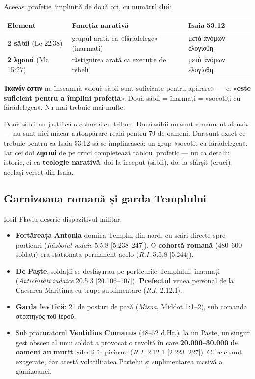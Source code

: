 \documentclass[12pt,a4paper,twoside,openany]{book}
\begin{document}
Aceeași profeție, împlinită de două ori, cu numărul \textbf{doi}:

\begin{center}
\small
\begin{tabularx}{\textwidth}{L{3.5cm}L{4.5cm}X}
\toprule
{}
\textbf{Element} & \textbf{Funcția narativă} & \textbf{Isaia 53:12} \\
\midrule
\textbf{2 săbii} (Lc 22:38) & grupul arată ca «fărădelege» (înarmați) & μετὰ ἀνόμων ἐλογίσθη \\
\textbf{2 λῃσταί} (Mc 15:27) & răstignirea arată ca execuție de rebeli & μετὰ ἀνόμων ἐλογίσθη \\
\bottomrule
\end{tabularx}
\end{center}

\textbf{Ἱκανόν ἐστιν} nu înseamnă «două săbii sunt suficiente pentru apărare» — ci «\textbf{este suficient pentru a împlini profeția}». Două săbii = înarmați = «socotiți cu fărădelegea». Nu mai trebuie mai multe.

Două săbii nu justifică o cohortă cu tribun. Două săbii nu sunt armament ofensiv — nu sunt nici măcar autoapărare reală pentru 70 de oameni. Dar sunt exact ce trebuie pentru ca Isaia 53:12 să se împlinească: un grup «socotit cu fărădelegea». Iar cei doi \textbf{λῃσταί} de pe cruci completează tabloul profetic — nu ca detaliu istoric, ci ca \textbf{teologie narativă}: doi la început (săbii), doi la sfârșit (cruci), același verset din Isaia.

\subsection{Garnizoana romană și garda Templului}

Iosif Flaviu descrie dispozitivul militar:

\begin{itemize}
  \item \textbf{Fortăreața Antonia} domina Templul din nord, cu scări directe spre porticuri (\textit{Războiul iudaic} 5.5.8 [5.238--247]). O \textbf{cohortă romană} (480--600 soldați) era staționată permanent acolo (\textit{R.I.} 5.5.8 [5.244]).
  \item \textbf{De Paște}, soldații se desfășurau pe porticurile Templului, înarmați (\textit{Antichități iudaice} 20.5.3 [20.106--107]). \textbf{Prefectul} venea personal de la Caesarea Maritima cu trupe suplimentare (\textit{R.I.} 2.12.1).
  \item \textbf{Garda levitică}: 21 de posturi de pază (\textit{Mișna}, Middot 1:1--2), sub comanda στρατηγὸς τοῦ ἱεροῦ.
  \item Sub procuratorul \textbf{Ventidius Cumanus} (48--52 d.Hr.), la un Paște, un singur gest obscen al unui soldat a provocat o revoltă în care \textbf{20.000--30.000 de oameni au murit} călcați în picioare (\textit{R.I.} 2.12.1 [2.223--227]). Cifrele sunt exagerate, dar atestă volatilitatea Paștelui și suplimentarea masivă a garnizoanei.
\end{itemize}
\end{document}
